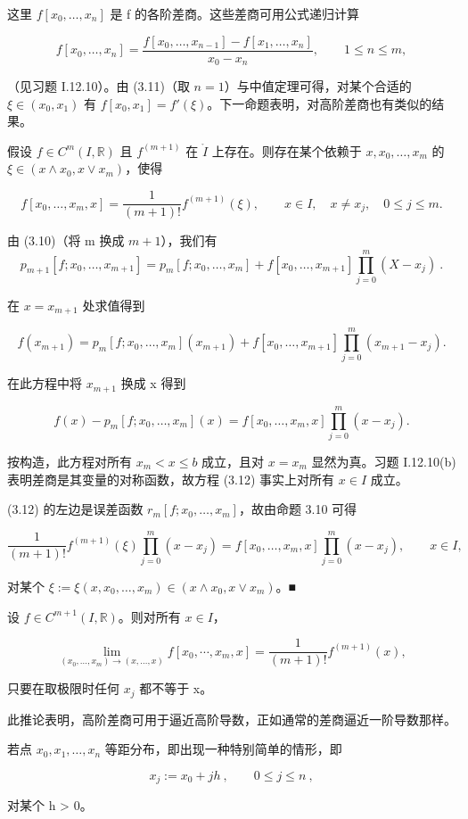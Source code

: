 这里 $ f[x_{0}, \ldots, x_{n}] $ 是 f 的各阶差商。这些差商可用公式递归计算

\[
f[x_{0},\ldots,x_{n}]=\frac{f[x_{0},\ldots,x_{n-1}]-f[x_{1},\ldots,x_{n}]}{x_{0}-x_{n}},\qquad1\leq n\leq m,
\]

（见习题 I.12.10）。由 (3.11)（取 $n=1$）与中值定理可得，对某个合适的 $\xi\in(x_0,x_1)$ 有 $f[x_0,x_1]=f'(\xi)$。下一命题表明，对高阶差商也有类似的结果。

\begin{proposition}

假设 $ f \in C^m(I, \mathbb{R}) $ 且 $ f^{(m+1)} $ 在 $ \mathring{I} $ 上存在。则存在某个依赖于 $ x, x_0, \ldots, x_m $ 的 $ \xi \in (x \land x_0, x \lor x_m) $，使得

\[
f[x_{0},\ldots,x_{m},x]=\frac{1}{(m+1)!}f^{(m+1)}(\xi),\qquad x\in I,\quad x\neq x_{j},\quad0\leq j\leq m.
\]

\proofhead
由 (3.10)（将 m 换成 $ m+1 $），我们有
\[
p_{m+1}[f;x_{0},\ldots,x_{m+1}]=p_{m}[f;x_{0},\ldots,x_{m}]+f[x_{0},\ldots,x_{m+1}]\prod_{j=0}^{m}(X-x_{j})~.
\]

在 $x = x_{m+1}$ 处求值得到

\[
f(x_{m+1})=p_{m}[f;x_{0},\ldots,x_{m}](x_{m+1})+f[x_{0},\ldots,x_{m+1}]\prod_{j=0}^{m}(x_{m+1}-x_{j}).
\]

在此方程中将 $ x_{m+1} $ 换成 x 得到

\[
f(x)-p_{m}[f;x_{0},\ldots,x_{m}](x)=f[x_{0},\ldots,x_{m},x]\prod_{j=0}^{m}(x-x_{j}).
\]

按构造，此方程对所有 $ x_m < x \leq b $ 成立，且对 $ x = x_m $ 显然为真。习题 I.12.10(b) 表明差商是其变量的对称函数，故方程 (3.12) 事实上对所有 $ x \in I $ 成立。

(3.12) 的左边是误差函数 $ r_m[f; x_0, \ldots, x_m] $，故由命题 3.10 可得

\[
\frac{1}{(m+1)!}f^{(m+1)}(\xi)\prod_{j=0}^{m}(x-x_{j})=f[x_{0},\ldots,x_{m},x]\prod_{j=0}^{m}(x-x_{j}),\qquad x\in I,
\]

对某个 $ \xi := \xi(x, x_0, \ldots, x_m) \in (x \land x_0, x \lor x_m) $。■

\end{proposition}

\begin{corollary}

设 $ f \in C^{m+1}(I, \mathbb{R}) $。则对所有 $ x \in I $，

\[
\lim_{(x_{0},\ldots,x_{m})\to(x,\ldots,x)}f[x_{0},\cdots,x_{m},x]=\frac{1}{(m+1)!}f^{(m+1)}(x),
\]

只要在取极限时任何 $ x_{j} $ 都不等于 x。

此推论表明，高阶差商可用于逼近高阶导数，正如通常的差商逼近一阶导数那样。

若点 $ x_{0}, x_{1}, \ldots, x_{n} $ 等距分布，即出现一种特别简单的情形，即

\[
x_{j}:=x_{0}+j h~,\qquad0\leq j\leq n~,
\]

对某个 h > 0。

\end{corollary}

